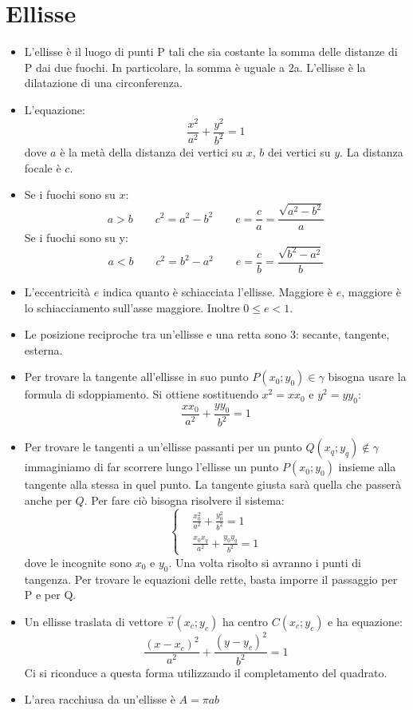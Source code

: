 \documentclass[]{article}
\begin{document}
\section{Ellisse}
\begin{itemize}
	\item L'ellisse è il luogo di punti P tali che sia costante la somma delle distanze di P dai due fuochi. In particolare, la somma è uguale a 2a. L'ellisse è la dilatazione di una circonferenza.
	\item L'equazione:
		$$\frac{x^2}{a^2}+\frac{y^2}{b^2}=1$$
		dove $a$ è la metà della distanza dei vertici su $x$, $b$ dei vertici su $y$. La distanza focale è $c$.
	\item Se i fuochi sono su $x$:
		$$ a > b \hspace{2em} c^2 = a^2-b^2 \hspace{2em} e=\frac{c}{a}=\frac{\sqrt{a^2-b^2}}{a}$$
		Se i fuochi sono su y:
		$$ a < b \hspace{2em} c^2 = b^2-a^2 \hspace{2em} e=\frac{c}{b}=\frac{\sqrt{b^2-a^2}}{b}$$
	\item L'eccentricità $e$ indica quanto è schiacciata l'ellisse. Maggiore è $e$, maggiore è lo schiacciamento sull'asse maggiore. Inoltre $0 \le e < 1$.
	\item Le posizione reciproche tra un'ellisse e una retta sono 3: secante, tangente, esterna.
	\item Per trovare la tangente all'ellisse in suo punto $P(x_0;y_0)\in\gamma$ bisogna usare la formula di sdoppiamento. Si ottiene sostituendo $x^2=xx_0$ e $y^2=yy_0$:
		$$\frac{xx_0}{a^2}+\frac{yy_0}{b^2}=1$$
	\item Per trovare le tangenti a un'ellisse passanti per un punto $Q(x_q;y_q)\not\in\gamma$ immaginiamo di far scorrere lungo l'ellisse un punto $P(x_0;y_0)$ insieme alla tangente alla stessa in quel punto. La tangente giusta sarà quella che passerà anche per $Q$. Per fare ciò bisogna risolvere il sistema:
		\begin{equation}
			\left\{
				\begin{aligned}
					&\frac{x_0^2}{a^2}+\frac{y_0^2}{b^2}=1\\
					&\frac{x_0x_q}{a^2}+\frac{y_0y_q}{b^2}=1
				\end{aligned}
			\right.
		\end{equation}
		dove le incognite sono $x_0$ e $y_0$. Una volta risolto si avranno i punti di tangenza. Per trovare le equazioni delle rette, basta imporre il passaggio per P e per Q.
	\item Un ellisse traslata di vettore $\vec{v}(x_c;y_c)$ ha centro $C(x_c;y_c)$ e ha equazione:
		$$\frac{(x-x_c)^2}{a^2}+\frac{(y-y_c)^2}{b^2}=1$$
		Ci si riconduce a questa forma utilizzando il completamento del quadrato.
	\item L'area racchiusa da un'ellisse è $A=\pi ab$

\end{itemize}
\end{document}
